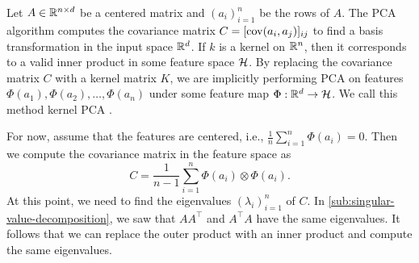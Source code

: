Let \(A \in \mathbb{R}^{n \times d}\) be a centered matrix and \((a_i)_{i=1}^n\) be the rows of \(A\).
The PCA algorithm computes the covariance matrix \(C = [\operatorname{cov}(a_i,a_j)]_{ij}\) to find a basis transformation in the input space \(\mathbb{R}^d\).
If \(k\) is a kernel on \(\mathbb{R}^n\), then it corresponds to a valid inner product in some feature space \(\mathcal{H}\).
By replacing the covariance matrix \(C\) with a kernel matrix \(K\), we are implicitly performing PCA on features \(\Phi(a_1), \Phi(a_2), \dots, \Phi(a_n)\) under some feature map \(\Phi : \mathbb{R}^d \to \mathcal{H}\).
We call this method kernel PCA \cite{scholkopf1998nonlinear}.

For now, assume that the features are centered, i.e., \(\frac{1}{n}\sum_{i=1}^{n} \Phi(a_i) = 0\).
Then we compute the covariance matrix in the feature space as
\begin{equation}
    C = \frac{1}{n-1} \sum_{i=1}^{n} \Phi(a_i) \otimes \Phi(a_i).
\end{equation}
At this point, we need to find the eigenvalues \((\lambda_i)_{i=1}^n\) of \(C\).
In \cref{sub:singular-value-decomposition}, we saw that \(AA^\top\) and \(A^\top A\) have the same eigenvalues.
It follows that we can replace the outer product with an inner product and compute the same eigenvalues.